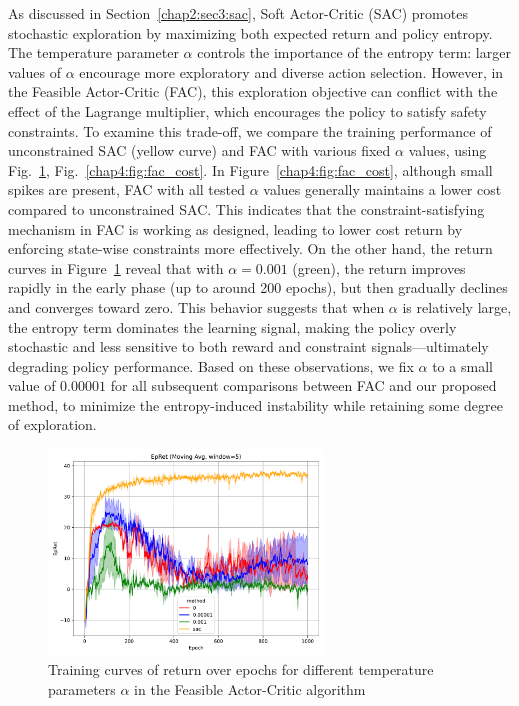 As discussed in Section~\ref{chap2:sec3:sac}, Soft Actor-Critic (SAC) promotes stochastic exploration by maximizing both expected return and policy entropy. 
The temperature parameter $\alpha$ controls the importance of the entropy term: larger values of $\alpha$ encourage more exploratory and diverse action selection.
However, in the Feasible Actor-Critic (FAC), this exploration objective can conflict with the effect of the Lagrange multiplier, which encourages the policy to satisfy safety constraints.
To examine this trade-off, we compare the training performance of unconstrained SAC (yellow curve) and FAC with various fixed $\alpha$ values, using Fig.~\ref{chap4:fig:fac_return}, Fig.~\ref{chap4:fig:fac_cost}.
In Figure~\ref{chap4:fig:fac_cost}, although small spikes are present, FAC with all tested $\alpha$ values generally maintains a lower cost compared to unconstrained SAC.
This indicates that the constraint-satisfying mechanism in FAC is working as designed, leading to lower cost return by enforcing state-wise constraints more effectively.
On the other hand, the return curves in Figure~\ref{chap4:fig:fac_return} reveal that with $\alpha = 0.001$ (green), the return improves rapidly in the early phase (up to around 200 epochs), but then gradually declines and converges toward zero.
This behavior suggests that when $\alpha$ is relatively large, the entropy term dominates the learning signal, making the policy overly stochastic and less sensitive to both reward and constraint signals—ultimately degrading policy performance.
Based on these observations, we fix $\alpha$ to a small value of $0.00001$ for all subsequent comparisons between FAC and our proposed method, to minimize the entropy-induced instability while retaining some degree of exploration.

\begin{figure}[h]
  \centering
  \includegraphics[width=0.65\textwidth]{imgs/chap4/fac/return.pdf}
  \caption{Training curves of return over epochs for different temperature parameters $\alpha$ in the Feasible Actor-Critic algorithm}
  \label{chap4:fig:fac_return}
\end{figure}

